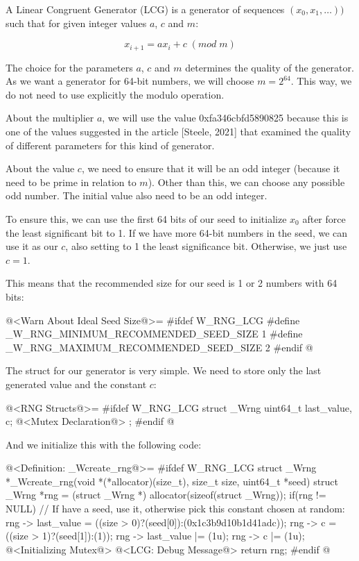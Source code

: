 

A Linear Congruent Generator (LCG) is a generator of sequences $(x_0,
x_1, \ldots))$ such that for given integer values $a$, $c$ and $m$:

$$
x_{i+1}=ax_i+c\; (mod\; m)
$$

The choice for the parameters $a$, $c$ and $m$ determines the quality
of the generator. As we want a generator for 64-bit numbers, we will
choose $m=2^{64}$. This way, we do not need to use explicitly the
modulo operation.

About the multiplier $a$, we will use the value 0xfa346cbfd5890825
because this is one of the values suggested in the article [Steele,
2021] that examined the quality of different parameters for this kind
of generator.

About the value $c$, we need to ensure that it will be an odd integer
(because it need to be prime in relation to $m$). Other than this, we
can choose any possible odd number. The initial value also need to be
an odd integer.

To ensure this, we can use the first 64 bits of our seed to initialize
$x_0$ after force the least significant bit to 1. If we have more
64-bit numbers in the seed, we can use it as our $c$, also setting to
1 the least significance bit. Otherwise, we just use $c=1$.


This means that the recommended size for our seed is 1 or 2 numbers
with 64 bits:

\iniciocodigo
@<Warn About Ideal Seed Size@>=
#ifdef W_RNG_LCG
#define _W_RNG_MINIMUM_RECOMMENDED_SEED_SIZE  1
#define _W_RNG_MAXIMUM_RECOMMENDED_SEED_SIZE  2
#endif
@
\fimcodigo

The struct for our generator is very simple. We need to store only the
last generated value and the constant $c$:

\iniciocodigo
@<RNG Structs@>=
#ifdef W_RNG_LCG
struct _Wrng{
  uint64_t last_value, c;
  @<Mutex Declaration@>
};
#endif
@
\fimcodigo

And we initialize this with the following code:

\iniciocodigo
@<Definition: \_Wcreate\_rng@>=
#ifdef W_RNG_LCG
struct _Wrng *_Wcreate_rng(void *(*allocator)(size_t), size_t size,
                           uint64_t *seed){
  struct _Wrng *rng = (struct _Wrng *) allocator(sizeof(struct _Wrng));
  if(rng != NULL){
    // If have a seed, use it, otherwise pick this constant chosen at random:
    rng -> last_value = ((size > 0)?(seed[0]):(0x1c3b9d10b1d41adc));
    rng -> c = ((size > 1)?(seed[1]):(1));
    rng -> last_value |= (1u);
    rng -> c |= (1u);
    @<Initializing Mutex@>
    @<LCG: Debug Message@>
  }
  return rng;
}
#endif
@
\fimcodigo

